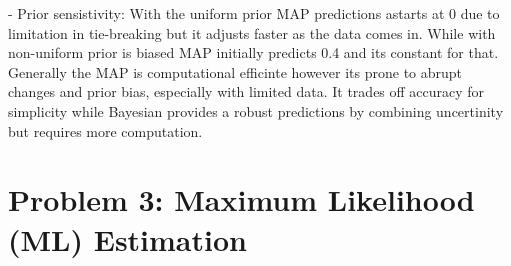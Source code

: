 \documentclass{article}
\begin{document}
- Prior sensistivity: With the uniform prior MAP predictions astarts at 0 due to limitation in tie-breaking but it adjusts faster as the data comes in. While with non-uniform
prior is biased  MAP initially predicts 0.4 and its constant for that. \\

Generally the MAP is computational efficinte however its prone to abrupt changes and prior bias, especially with limited data. It trades off accuracy for simplicity while Bayesian provides a robust predictions
by combining uncertinity but requires more computation.


\clearpage

\section*{Problem 3: Maximum Likelihood (ML) Estimation}
\end{document}
